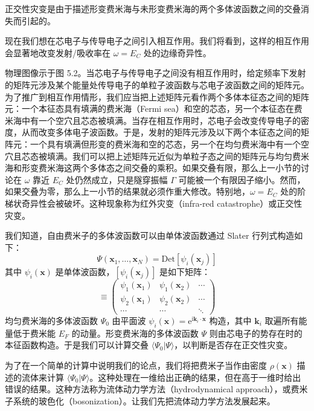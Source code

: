 \begin{keypoints}
\item 正交性灾变是由于描述形变费米海与未形变费米海的两个多体波函数之间的交叠消失而引起的。
\end{keypoints}

现在我们想在芯电子与传导电子之间引入相互作用。我们将看到，这样的相互作用会显著地改变发射/吸收率在 $\omega=E_C$ 处的边缘奇异性。

物理图像示于图 5.2。当芯电子与传导电子之间没有相互作用时，给定频率下发射的矩阵元涉及某个能量处传导电子的单粒子波函数与芯电子波函数之间的矩阵元。为了推广到相互作用情形，我们应当把上述矩阵元看作两个多体本征态之间的矩阵元：一个本征态具有填满的费米海（Fermi sea）和空的芯态，另一个本征态在费米海中有一个空穴且芯态被填满。当存在相互作用时，芯电子会改变传导电子的密度，从而改变多体电子波函数。于是，发射的矩阵元涉及以下两个本征态之间的矩阵元：一个具有填满但形变的费米海和空的芯态，另一个在均匀费米海中有一个空穴且芯态被填满。我们可以把上述矩阵元近似为单粒子态之间的矩阵元与均匀费米海和形变费米海这两个多体态之间交叠的乘积。如果交叠有限，那么上一小节的讨论在 $\omega$ 靠近 $E_C$ 处仍然成立，只是隧穿振幅 $\Gamma$ 可能被一个有限因子缩小。然而，如果交叠为零，那么上一小节的结果就必须作重大修改。特别地，$\omega=E_C$ 处的阶梯状奇异性会被破坏。这种现象称为红外灾变（infra-red catastrophe）或正交性灾变。

我们知道，自由费米子的多体波函数可以由单体波函数通过 Slater 行列式构造如下：
\begin{equation*}
\Psi(\pmb{x}_1,\ldots,\pmb{x}_N)=\mathrm{Det}[\psi_i(\pmb{x}_j)]
\end{equation*}
其中 $\psi_i(\pmb{x})$ 是单体波函数，$[\psi_i(\pmb{x}_j)]$ 是如下矩阵：
\begin{equation*}
[\psi_i(\pmb{x}_j)]\equiv
\begin{pmatrix}
\psi_1(\pmb{x}_1) & \psi_1(\pmb{x}_2) & \cdots\\
\psi_2(\pmb{x}_1) & \psi_2(\pmb{x}_2) & \cdots\\
\cdots & \cdots & \ddots
\end{pmatrix}
\end{equation*}
均匀费米海的多体波函数 $\Psi_0$ 由平面波 $\psi_i(\pmb{x})=\mathrm{e}^{\mathrm{i}\pmb{k}_i\cdot\pmb{x}}$ 构造，其中 $\pmb{k}_i$ 取遍所有能量低于费米能 $E_F$ 的动量。形变费米海的多体波函数 $\Psi$ 则由芯电子的势存在时的本征函数构造。于是我们可以计算交叠 $\langle\Psi_0|\Psi\rangle$，以判断是否存在正交性灾变。

为了在一个简单的计算中说明我们的论点，我们将把费米子当作由密度 $\rho(\pmb{x})$ 描述的流体来计算 $\langle\Psi_0|\Psi\rangle$。这种处理在一维给出正确的结果，但在高于一维时给出错误的结果。这种方法称为流体动力学方法（hydrodynamical approach），或费米子系统的玻色化（bosonization）。让我们先把流体动力学方法发展起来。

